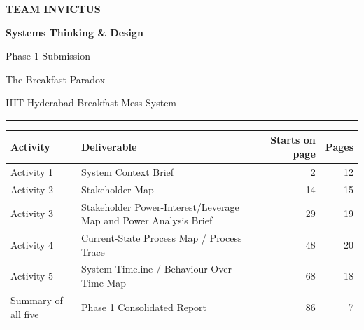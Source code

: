 \documentclass[
  10pt,
  table]{article}
\author{}
\date{}
\begin{document}
\thispagestyle{empty}
\vspace*{1.3in}
\begin{center}
{\color{pblue2}\fontsize{14}{16}\selectfont\bfseries TEAM INVICTUS\par}
\vspace{16pt}
{\color{pblue}\fontsize{34}{40}\selectfont\bfseries Systems Thinking \& Design\par Phase 1 Submission\par}
\vspace{14pt}
{\color{pslate}\Large The Breakfast Paradox\par}
{\color{pslate}\normalsize IIIT Hyderabad Breakfast Mess System\par}
\vspace{18pt}
{\color{prule}\rule{2.6in}{1.4pt}}
\end{center}
\vspace{22pt}
\begin{center}
\renewcommand{\arraystretch}{1.5}
\footnotesize
\begin{tabular}{@{}p{1.3in}p{3.7in}rr@{}}
\textbf{\color{pblue}Activity} & \textbf{\color{pblue}Deliverable} & \textbf{\color{pblue}Starts on page} & \textbf{\color{pblue}Pages}\\
\hline
Activity 1 & System Context Brief & 2 & 12 \\
Activity 2 & Stakeholder Map & 14 & 15 \\
Activity 3 & Stakeholder Power-Interest/Leverage Map and Power Analysis Brief & 29 & 19 \\
Activity 4 & Current-State Process Map / Process Trace & 48 & 20 \\
Activity 5 & System Timeline / Behaviour-Over-Time Map & 68 & 18 \\
Summary of all five & Phase 1 Consolidated Report & 86 & 7 \\
\end{tabular}
\end{center}
\end{document}
